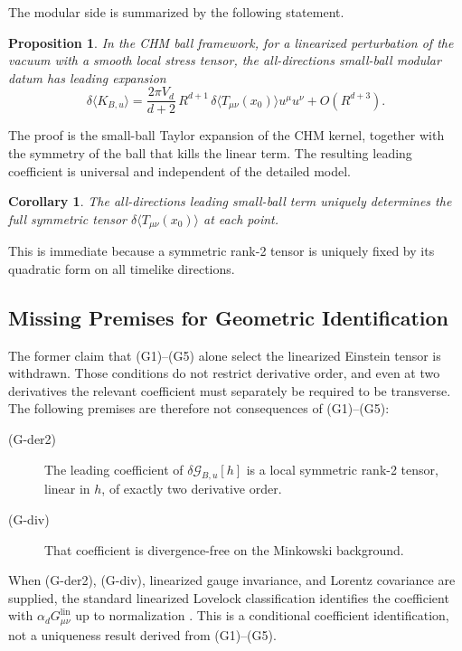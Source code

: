 \documentclass[12pt]{article}
\newtheorem{proposition}[theorem]{Proposition}
\newtheorem{corollary}[theorem]{Corollary}
\theoremstyle{definition}
\theoremstyle{remark}
\begin{document}
The modular side is summarized by the following statement.

\begin{proposition}\label{prop:II.1}
In the CHM ball framework, for a linearized perturbation of the vacuum
with a smooth local stress tensor, the all-directions small-ball modular
datum has leading expansion
\[
\delta\langle K_{B,u}\rangle
=
\frac{2\pi V_d}{d+2}\,
R^{d+1}\,
\delta\langle T_{\mu\nu}(x_0)\rangle u^\mu u^\nu
+
O(R^{d+3}).
\]
\end{proposition}

The proof is the small-ball Taylor expansion of the CHM kernel, together with the symmetry of the ball that kills the linear term. The resulting leading coefficient is universal and independent of the detailed model.

\begin{corollary}\label{cor:II.1.1}
The all-directions leading small-ball term uniquely determines the full symmetric tensor \(\delta\langle T_{\mu\nu}(x_0)\rangle\) at each point.
\end{corollary}

This is immediate because a symmetric rank-2 tensor is uniquely fixed by its quadratic form on all timelike directions.

\subsection{Missing Premises for Geometric Identification}\label{subsec:4.2}

The former claim that (G1)--(G5) alone select the linearized Einstein
tensor is withdrawn. Those conditions do not restrict derivative order,
and even at two derivatives the relevant coefficient must separately be
required to be transverse. The following premises are therefore not
consequences of (G1)--(G5):

\begin{description}
\item[(G-der2)] The leading coefficient of
\(\delta\mathcal{G}_{B,u}[h]\) is a local symmetric rank-2 tensor,
linear in \(h\), of exactly two derivative order.
\item[(G-div)] That coefficient is divergence-free on the Minkowski
background.
\end{description}

When (G-der2), (G-div), linearized gauge invariance, and Lorentz
covariance are supplied, the standard linearized Lovelock classification
identifies the coefficient with
\(\alpha_d G^{\mathrm{lin}}_{\mu\nu}\) up to normalization
\cite{Lovelock1971}. This is a conditional coefficient identification,
not a uniqueness result derived from (G1)--(G5).
\end{document}
